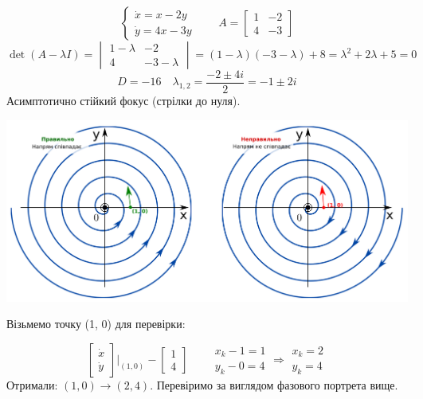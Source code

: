    \begin{example}
        $$
        \begin{cases}
            \dot{x } = x - 2y\\
            \dot{y} = 4x - 3y
        \end{cases} \qquad A = \begin{bmatrix}
         1 & -2 \\
         4 & -3
        \end{bmatrix}
        $$
        $$ \det{(A - \lambda I)} = \begin{vmatrix}
          1- \lambda & -2 \\
          4 & -3-\lambda
        \end{vmatrix}  = ( 1- \lambda) (-3 - \lambda) + 8 = \lambda^2 + 2 \lambda + 5 = 0$$
    $$
    D = -16 \quad \lambda_{1,2} = \frac{-2 \pm 4i}{2} = -1 \pm 2i
    $$
    Асимптотично стійкий фокус (стрілки до нуля).
    \begin{center} \includegraphics[scale=0.27]{assets/lectures_recent-b90426e3.png} \end{center}
    Візьмемо точку (1, 0) для перевірки:

    $$
    \begin{bmatrix}
     \dot{x}\\
     \dot{y}
    \end{bmatrix}\Bigg|_{(1,0)} - \begin{bmatrix}
     1 \\
     4
    \end{bmatrix} \qquad \begin{gathered}
     x_k -1 = 1 \\
     y_k - 0 = 4
    \end{gathered} \Rightarrow \begin{gathered}
     x_k = 2 \\
     y_k  = 4
    \end{gathered}
    $$
    Отримали: $(1,0) \to (2, 4)$. Перевіримо за виглядом фазового портрета вище.
    \end{example}

